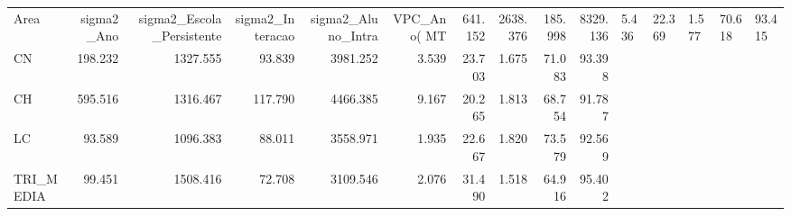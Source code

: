 \begin{tabular}{lrrrrrrrrr}
\toprule
Area & sigma2_Ano & sigma2_Escola_Persistente & sigma2_Interacao & sigma2_Aluno_Intra & VPC_Ano(%
\midrule
MT & 641.152 & 2638.376 & 185.998 & 8329.136 & 5.436 & 22.369 & 1.577 & 70.618 & 93.415 \\
CN & 198.232 & 1327.555 & 93.839 & 3981.252 & 3.539 & 23.703 & 1.675 & 71.083 & 93.398 \\
CH & 595.516 & 1316.467 & 117.790 & 4466.385 & 9.167 & 20.265 & 1.813 & 68.754 & 91.787 \\
LC & 93.589 & 1096.383 & 88.011 & 3558.971 & 1.935 & 22.667 & 1.820 & 73.579 & 92.569 \\
TRI_MEDIA & 99.451 & 1508.416 & 72.708 & 3109.546 & 2.076 & 31.490 & 1.518 & 64.916 & 95.402 \\
\bottomrule
\end{tabular}

